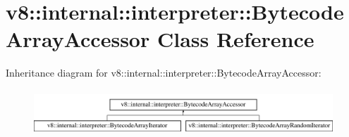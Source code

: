 \hypertarget{classv8_1_1internal_1_1interpreter_1_1BytecodeArrayAccessor}{}\section{v8\+:\+:internal\+:\+:interpreter\+:\+:Bytecode\+Array\+Accessor Class Reference}
\label{classv8_1_1internal_1_1interpreter_1_1BytecodeArrayAccessor}
Inheritance diagram for v8\+:\+:internal\+:\+:interpreter\+:\+:Bytecode\+Array\+Accessor\+:\begin{figure}[H]
\begin{center}
\leavevmode
\includegraphics[height=1.728395cm]{classv8_1_1internal_1_1interpreter_1_1BytecodeArrayAccessor}
\end{center}
\end{figure}
